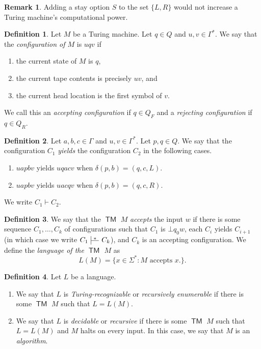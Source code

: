 \documentclass[10pt,letterpaper,cm]{nupset}
\theoremstyle{definition}
\newtheorem*{definition}{Definition}
\newtheorem{remark}{Remark}
\def\ruleoffset{1pt}
\newcommand\specialvdash[2]{\mathrel{\ensurestackMath{
  \mkern2mu\rule[-\dp\strutbox]{.4pt}{\baselineskip}\stackon[\ruleoffset]{
    \stackunder[\dimexpr\ruleoffset-.4\ht\strutbox+.4\dp\strutbox]{
      \rule[\dimexpr.4\ht\strutbox-.4\dp\strutbox]{2.5ex}{.4pt}}{
        \scriptstyle #1}}{\scriptstyle#2}\mkern2mu}}
}
\newcommand{\1}{\mathbf{1}}
\newcommand{\0}{\vec 0}
\DeclareMathOperator{\TM}{\mathsf{TM}}
\begin{document}
\begin{remark}
Adding a stay option $S$ to the set $\{L, R\}$ would not increase a Turing machine's computational power.
\end{remark}

\begin{definition}
Let $M$ be a Turing machine. Let $q\in Q$ and $u,v\in \Gamma^{\ast}$. We say that the \textit{configuration of $M$} is $uqv$ if 
\begin{enumerate}[label=(\alph*)]
\item the current state of $M$ is $q$,
\item the current tape contents is precisely $uv$, and
\item the current head location is the first symbol of $v$.
\end{enumerate}
We call this an \textit{accepting configuration} if $q \in Q_F$ and a \textit{rejecting configuration} if $q \in Q_R$.
\end{definition}

\begin{definition}
Let $a,b,c\in \Gamma$ and $u,v\in \Gamma^{\ast}$. Let $p,q\in Q$. We say that the configuration $C_1$ \textit{yields} the configuration $C_2$ in the following cases. 
\begin{enumerate}[label=(\alph*)]
\item $uapbv$ yields $uqacv$ when $\delta(p,b) = (q, c, L)$.
\item $uapbv$ yields $uacqv$ when $\delta(p, b) = (q, c, R)$. 
\end{enumerate}
We write $C_1 \vdash C_2$.
\end{definition}

\begin{definition}
We say that the $\TM$ $M$ \textit{accepts} the input $w$ if there is some sequence $C_1, \ldots, C_k$ of configurations such that $C_1$ is $\bot q_0w$, each $C_i$ yields $C_{i+1}$ (in which case we write $C_1 \specialvdash{}{*} C_k $), and $C_k$ is an accepting configuration.  We define the \textit{language of the $\TM$ $M$} as $$L(M) = \{x \in \Sigma^{\ast}: M \text{ accepts } x. \}.$$
\end{definition}

\begin{definition} Let $L$ be a language.
\begin{enumerate}
\item We say that $L$ is \textit{Turing-recognizable} or \textit{recursively enumerable} if there is some $\TM$ $M$ such that $L = L(M)$.
\item We say that $L$ is \textit{decidable} or \textit{recursive} if there is some $\TM$ $M$ such that $L= L(M)$ and $M$ halts on every input. In this case, we say that $M$ is an \textit{algorithm}.
\end{enumerate}
\end{definition}
\end{document}
